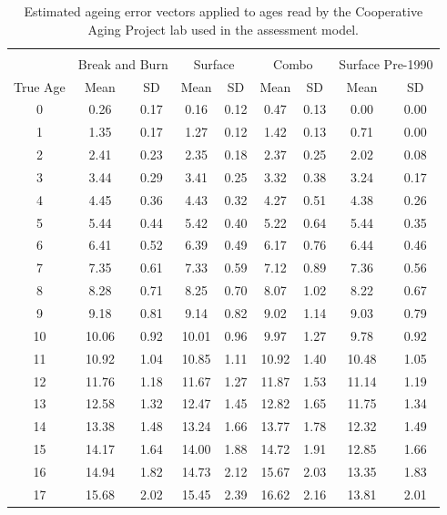 \documentclass[12pt,]{article}
\begin{document}
\begin{table}[ht]
\centering
\caption{Estimated ageing error vectors applied to ages read by the Cooperative Aging Project lab used in the assessment model.} 
\label{tab:age_error1}
\begin{tabular}{ccccccccc}
  \hline
 &  &  &  &  &  &  &  &  \\ 
   & \multicolumn{2}{c}{Break and Burn} &  \multicolumn{2}{c}{Surface} & \multicolumn{2}{c}{Combo} & \multicolumn{2}{c}{Surface Pre-1990} \\
 True Age & Mean & SD & Mean &  SD  & Mean &  SD & Mean & SD \\
 \hline
0 & 0.26 & 0.17 & 0.16 & 0.12 & 0.47 & 0.13 & 0.00 & 0.00 \\ 
  1 & 1.35 & 0.17 & 1.27 & 0.12 & 1.42 & 0.13 & 0.71 & 0.00 \\ 
  2 & 2.41 & 0.23 & 2.35 & 0.18 & 2.37 & 0.25 & 2.02 & 0.08 \\ 
  3 & 3.44 & 0.29 & 3.41 & 0.25 & 3.32 & 0.38 & 3.24 & 0.17 \\ 
  4 & 4.45 & 0.36 & 4.43 & 0.32 & 4.27 & 0.51 & 4.38 & 0.26 \\ 
  5 & 5.44 & 0.44 & 5.42 & 0.40 & 5.22 & 0.64 & 5.44 & 0.35 \\ 
  6 & 6.41 & 0.52 & 6.39 & 0.49 & 6.17 & 0.76 & 6.44 & 0.46 \\ 
  7 & 7.35 & 0.61 & 7.33 & 0.59 & 7.12 & 0.89 & 7.36 & 0.56 \\ 
  8 & 8.28 & 0.71 & 8.25 & 0.70 & 8.07 & 1.02 & 8.22 & 0.67 \\ 
  9 & 9.18 & 0.81 & 9.14 & 0.82 & 9.02 & 1.14 & 9.03 & 0.79 \\ 
  10 & 10.06 & 0.92 & 10.01 & 0.96 & 9.97 & 1.27 & 9.78 & 0.92 \\ 
  11 & 10.92 & 1.04 & 10.85 & 1.11 & 10.92 & 1.40 & 10.48 & 1.05 \\ 
  12 & 11.76 & 1.18 & 11.67 & 1.27 & 11.87 & 1.53 & 11.14 & 1.19 \\ 
  13 & 12.58 & 1.32 & 12.47 & 1.45 & 12.82 & 1.65 & 11.75 & 1.34 \\ 
  14 & 13.38 & 1.48 & 13.24 & 1.66 & 13.77 & 1.78 & 12.32 & 1.49 \\ 
  15 & 14.17 & 1.64 & 14.00 & 1.88 & 14.72 & 1.91 & 12.85 & 1.66 \\ 
  16 & 14.94 & 1.82 & 14.73 & 2.12 & 15.67 & 2.03 & 13.35 & 1.83 \\ 
  17 & 15.68 & 2.02 & 15.45 & 2.39 & 16.62 & 2.16 & 13.81 & 2.01 \\ 
   \hline
\end{tabular}
\end{table}
\end{document}

